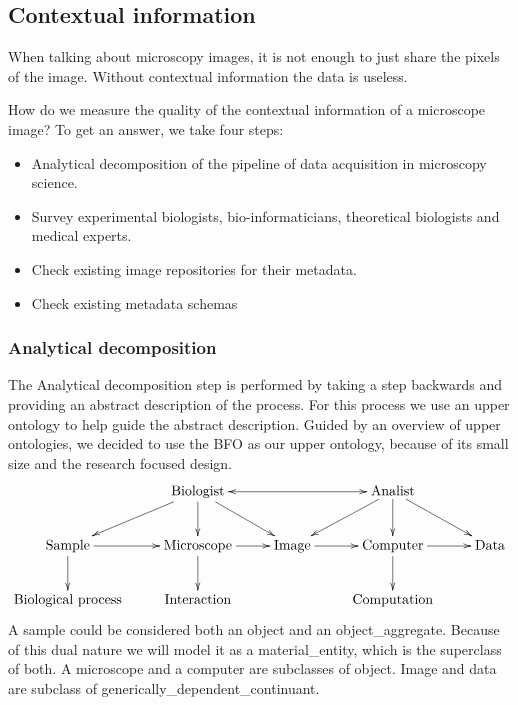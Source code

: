 \subsection{Contextual information}

When talking about microscopy images, it is
not enough to just share the pixels of the
image. Without contextual
information the data is useless.

How do we measure the quality of the contextual information of a
microscope image? To get an answer, we take four steps:
\begin{itemize}
\item Analytical decomposition of the
  pipeline of data acquisition
  in microscopy science.
\item Survey experimental biologists, bio-informaticians, theoretical
  biologists and medical experts.
\item Check existing image repositories for
  their metadata.
\item Check existing metadata schemas
\end{itemize}

\subsubsection{Analytical decomposition}

The Analytical decomposition
step is performed by taking a
step backwards and providing an abstract description of the
process. For this process we use an upper
ontology
to help guide the abstract description. Guided by an overview of upper
ontologies\cite{mascardi2007comparison}, we decided to use the
BFO\cite{grenon2004biodynamic} as our upper ontology, because of its
small size and the research focused design.
\begin{displaymath}
  \xymatrix{ & \text{Biologist} \ar[dl] \ar[d] \ar[dr] \ar@{<->}[rr] &
    & \text{Analist} \ar[dl] \ar[d] \ar[dr] & \\ \text{Sample} \ar[d]
    \ar[r] & \text{Microscope} \ar[d] \ar[r] & \text{Image} \ar[r] &
    \text{Computer} \ar[d] \ar[r] & \text{Data} \\ \text{Biological
      process} & \text{Interaction} & & \text{Computation} & }
\end{displaymath}
A sample could be considered both an
object and an
object\_aggregate. Because of this dual nature
we will model it as a material\_entity, which
is the superclass of both. A microscope and a
computer are subclasses of
object. Image and data are
subclass of
generically\_dependent\_continuant.

